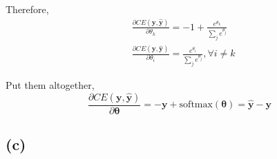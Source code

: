 \documentclass[12pt]{article}
\begin{document}
Therefore, 
\begin{align*}
&\frac{\partial CE(\bm y, \bm {\hat y})} {\partial \theta_k} = -1 + \frac{e^{\theta_k}}{\sum_j e^{\theta_j}}  \\
&\frac{\partial CE(\bm y, \bm {\hat y})} {\partial \theta_i} =  \frac{e^{\theta_i}}{\sum_j e^{\theta_j}}, \forall i \neq k
\end{align*}

Put them altogether,
$$
\frac{\partial CE(\bm y, \bm {\hat y})} {\partial \bm \theta} = -\bm y + \text{softmax}(\bm {\theta}) = \bm {\hat y} - \bm y
$$

\subsection*{(c)}








	
\end{document}
